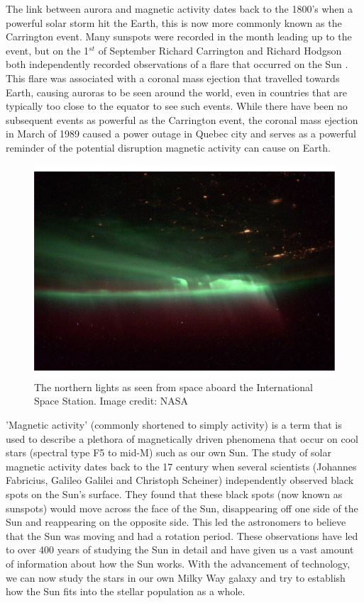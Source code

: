The link between aurora and magnetic activity dates back to the 1800's when a powerful solar storm hit the Earth, this is now more commonly known as the Carrington event. Many sunspots were recorded in the month leading up to the event, but on the 1$^{st}$ of September Richard Carrington and Richard Hodgson both independently recorded observations of a flare that occurred on the Sun \citep{Carrington_1858,Hodgson_1859}. This flare was associated with a coronal mass ejection that travelled towards Earth, causing auroras to be seen around the world, even in countries that are typically too close to the equator to see such events. While there have been no subsequent events as powerful as the Carrington event, the coronal mass ejection in March of 1989 caused a power outage in Quebec city and serves as a powerful reminder of the potential disruption magnetic activity can cause on Earth. 

\begin{figure}
    \centering
    \includegraphics[scale=0.4]{Figures/1-Introduction/northern_lights_iss_20131009.pdf}
    \caption[Image of the northern lights as seen from space]{The northern lights as seen from space aboard the International Space Station. Image credit: NASA}
    \label{fig:aurora_from_space}
\end{figure}

'Magnetic activity' (commonly shortened to simply activity) is a term that is used to describe a plethora of magnetically driven phenomena that occur on cool stars (spectral type F5 to mid-M) such as our own Sun. The study of solar magnetic activity dates back to the 17 century when several scientists (Johannes Fabricius, Galileo Galilei and Christoph Scheiner) independently observed black spots on the Sun's surface. They found that these black spots (now known as sunspots) would move across the face of the Sun, disappearing off one side of the Sun and reappearing on the opposite side. This led the astronomers to believe that the Sun was moving and had a rotation period. These observations have led to over 400 years of studying the Sun in detail and have given us a vast amount of information about how the Sun works. With the advancement of technology, we can now study the stars in our own Milky Way galaxy and try to establish how the Sun fits into the stellar population as a whole.

